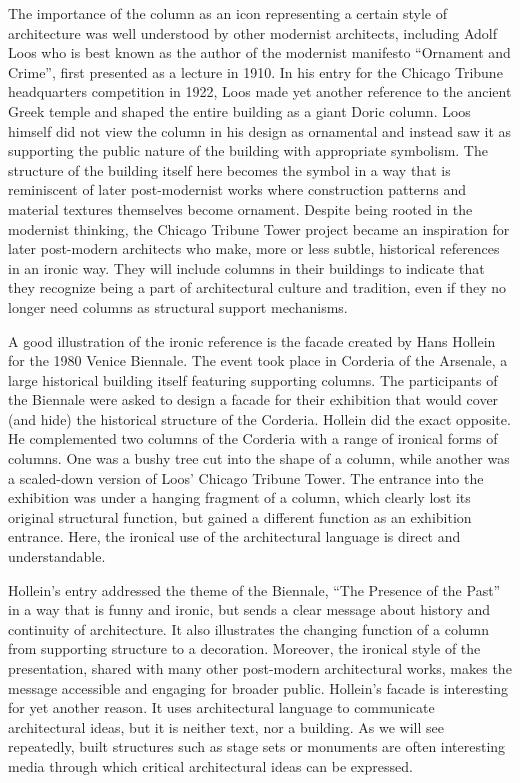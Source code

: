The importance of the column as an icon representing a certain style of architecture was well
understood by other modernist architects, including Adolf Loos who is best known as the author
of the modernist manifesto ``Ornament and Crime'', first presented as a lecture in 1910. In his entry
for the Chicago Tribune headquarters competition in 1922, Loos made yet another reference to the
ancient Greek temple and shaped the entire building as a giant Doric column.  Loos himself did not
view the column in his design as ornamental and instead saw it as supporting the public nature of
the building with appropriate symbolism.
The structure of the building itself here becomes the symbol in a way that is reminiscent
of later post-modernist works where construction patterns and material textures themselves become
ornament. Despite being rooted in the modernist thinking, the Chicago Tribune
Tower project became an inspiration for later post-modern architects who make, more or less subtle,
historical references in an ironic way. They will include columns in their buildings to indicate
that they recognize being a part of architectural culture and tradition, even if they no longer
need columns as structural support mechanisms.

A good illustration of the ironic reference is the facade created by Hans Hollein for the 1980
Venice Biennale. The event took place in Corderia of the Arsenale, a large historical building
itself featuring supporting columns. The participants of the Biennale were asked to design a
facade for their exhibition that would cover (and hide) the historical structure of the Corderia.
Hollein did the exact opposite. He complemented two columns of the Corderia with a range of
ironical forms of columns. One was a bushy tree cut into the shape of a column, while another was
a scaled-down version of Loos' Chicago Tribune Tower. The entrance into the exhibition was under
a hanging fragment of a column, which clearly lost its original structural function, but gained
a different function as an exhibition entrance. Here, the ironical use of the architectural
language is direct and understandable.

Hollein's entry addressed the theme of the Biennale, ``The Presence of the Past'' in a way that
is funny and ironic, but sends a clear message about history and continuity of architecture. It
also illustrates the changing function of a column from supporting structure to a decoration. Moreover,
the ironical style of the presentation, shared with many other post-modern architectural works, makes
the message accessible and engaging for broader public. Hollein's facade is interesting for
yet another reason. It uses architectural language to communicate architectural ideas, but it
is neither text, nor a building. As we will see repeatedly, built structures such as stage sets
or monuments are often interesting media through which critical architectural ideas can be
expressed.

